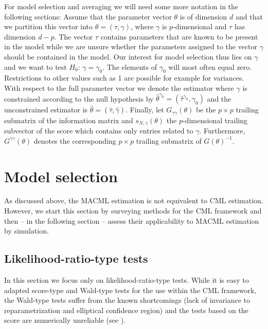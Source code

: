 \documentclass[12pt, a4paper]{article}
\numberwithin{defcounter}{section}
\numberwithin{excounter}{section}
\begin{document}
For model selection and averaging we will need some more notation in the following sections: Assume that the parameter vector $\theta$ is of dimension $d$ and that we partition this vector into $\theta = (\tau,\gamma)$, where $\gamma$ is $p$-dimensional and $\tau$ has dimension $d-p$. The vector $\tau$ contains parameters that are known to be present in the model while we are unsure whether the parameters assigned to the vector $\gamma$ should be contained in the model. 
Our interest for model selection thus lies on $\gamma$ and we want to test $H_0$: $\gamma = \gamma_0$. The elements of $\gamma_0$ will most often equal zero. Restrictions to other values such as 1 are possible for example for variances.  
\\
With respect to the full parameter vector we denote the estimator where $\gamma$ is constrained according to the null hypothesis by $\hat{\theta}^{\gamma_0} = (\hat{\tau}^{\gamma_0}, \gamma_0)$ and the unconstrained estimator is $\hat{\theta} = (\hat{\tau},\hat{\gamma})$. Finally, let $G_{\gamma \gamma}(\theta)$ be the $p \times p$ trailing submatrix of the information matrix and $s_{N,\gamma}(\theta)$ the $p$-dimensional trailing subvector of the score which contains only entries related to $\gamma$. Furthermore, $G^{\gamma \gamma}(\theta)$ denotes the corresponding $p \times p$ trailing submatrix of  $G(\theta)^{-1}$.


\section{Model selection}

As discussed above, the \ac{MACML} estimation is not equivalent to \ac{CML} estimation. However, we start this section by surveying methods for the \ac{CML} framework and then -- in the following section -- assess their applicability to \ac{MACML} estimation by simulation.

\subsection{Likelihood-ratio-type tests}
\label{chap:tests}
In this section we focus only on likelihood-ratio-type tests. While it is easy to adapted score-type and Wald-type tests for the use within the \ac{CML} framework, the Wald-type tests suffer from the known shortcomings (lack of invariance to reparametrization and elliptical confidence region) and the tests based on the score are numerically unreliable (see \cite[193f]{molenberghs2005}). 
\end{document}
